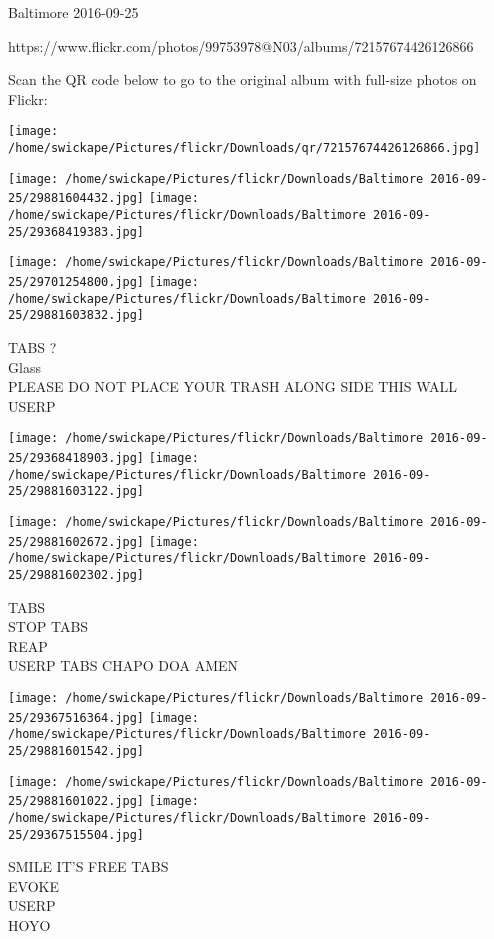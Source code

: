 \documentclass[10pt,letterpaper]{article}
\begin{document}
Baltimore 2016-09-25

https://www.flickr.com/photos/99753978@N03/albums/72157674426126866

Scan the QR code below to go to the original album with full-size photos on Flickr:

\texttt{[image: /home/swickape/Pictures/flickr/Downloads/qr/72157674426126866.jpg]}
\pagebreak

\texttt{[image: /home/swickape/Pictures/flickr/Downloads/Baltimore 2016-09-25/29881604432.jpg]}
\texttt{[image: /home/swickape/Pictures/flickr/Downloads/Baltimore 2016-09-25/29368419383.jpg]}

\texttt{[image: /home/swickape/Pictures/flickr/Downloads/Baltimore 2016-09-25/29701254800.jpg]}
\texttt{[image: /home/swickape/Pictures/flickr/Downloads/Baltimore 2016-09-25/29881603832.jpg]}

TABS ?\\
Glass\\
PLEASE DO NOT PLACE YOUR TRASH ALONG SIDE THIS WALL\\
USERP\\
\pagebreak

\texttt{[image: /home/swickape/Pictures/flickr/Downloads/Baltimore 2016-09-25/29368418903.jpg]}
\texttt{[image: /home/swickape/Pictures/flickr/Downloads/Baltimore 2016-09-25/29881603122.jpg]}

\texttt{[image: /home/swickape/Pictures/flickr/Downloads/Baltimore 2016-09-25/29881602672.jpg]}
\texttt{[image: /home/swickape/Pictures/flickr/Downloads/Baltimore 2016-09-25/29881602302.jpg]}

TABS\\
STOP TABS\\
REAP\\
USERP TABS CHAPO DOA AMEN\\
\pagebreak

\texttt{[image: /home/swickape/Pictures/flickr/Downloads/Baltimore 2016-09-25/29367516364.jpg]}
\texttt{[image: /home/swickape/Pictures/flickr/Downloads/Baltimore 2016-09-25/29881601542.jpg]}

\texttt{[image: /home/swickape/Pictures/flickr/Downloads/Baltimore 2016-09-25/29881601022.jpg]}
\texttt{[image: /home/swickape/Pictures/flickr/Downloads/Baltimore 2016-09-25/29367515504.jpg]}

SMILE IT'S FREE TABS\\
EVOKE\\
USERP\\
HOYO\\
\pagebreak
\end{document}
